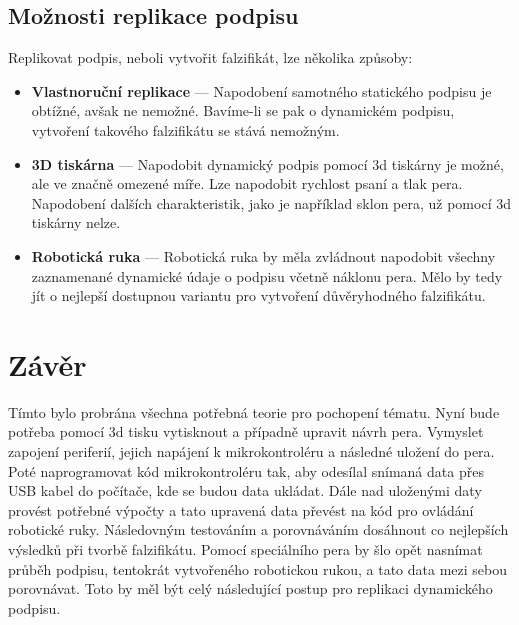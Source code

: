 \section{Možnosti replikace podpisu}
Replikovat podpis, neboli vytvořit falzifikát, lze několika způsoby:

\begin{itemize}
  \item \textbf{Vlastnoruční replikace} --- 
  Napodobení samotného statického podpisu je obtížné, avšak ne nemožné. 
  Bavíme-li se pak o dynamickém podpisu, vytvoření takového falzifikátu se stává nemožným.

  \item \textbf{3D tiskárna} ---
  Napodobit dynamický podpis pomocí 3d tiskárny je možné, ale ve značně omezené míře.
  Lze napodobit rychlost psaní a tlak pera. 
  Napodobení dalších charakteristik, jako je například sklon pera, už pomocí 3d tiskárny nelze.

  \item \textbf{Robotická ruka} ---
  Robotická ruka by měla zvládnout napodobit všechny zaznamenané dynamické údaje o podpisu včetně náklonu pera.
  Mělo by tedy jít o nejlepší dostupnou variantu pro vytvoření důvěryhodného falzifikátu. 
\end{itemize}

\chapter{Závěr}
Tímto bylo probrána všechna potřebná teorie pro pochopení tématu.
Nyní bude potřeba pomocí 3d tisku vytisknout a případně upravit návrh pera.
Vymyslet zapojení periferií, jejich napájení k mikrokontroléru a následné uložení do pera.
Poté naprogramovat kód mikrokontroléru tak, aby odesílal snímaná data přes USB kabel do počítače, kde se budou data ukládat.
Dále nad uloženými daty provést potřebné výpočty a tato upravená data převést na kód pro ovládání robotické ruky.
Následovným testováním a porovnáváním dosáhnout co nejlepších výsledků při tvorbě falzifikátu.
Pomocí speciálního pera by šlo opět nasnímat průběh podpisu, tentokrát vytvořeného robotickou rukou, a tato data mezi sebou porovnávat.
Toto by měl být celý následující postup pro replikaci dynamického podpisu.



